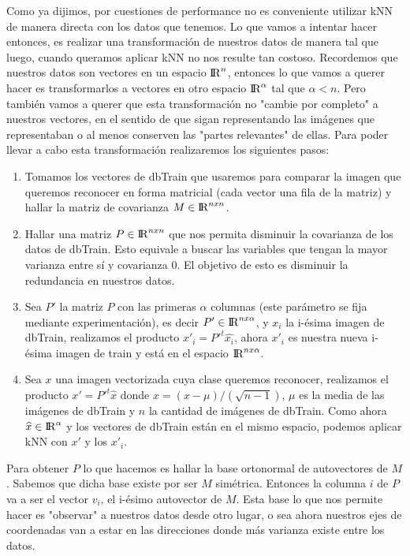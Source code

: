 \par Como ya dijimos, por cuestiones de performance no es conveniente utilizar kNN de manera directa con los datos que tenemos. Lo que vamos a intentar hacer entonces, es realizar una transformación de nuestros datos de manera tal que luego, cuando queramos aplicar kNN no nos resulte tan costoso. Recordemos que nuestros datos son vectores en un espacio ${\rm I\!R}^n$, entonces lo que vamos a querer hacer es transformarlos a vectores en otro espacio ${\rm I\!R}^\alpha$ tal que $\alpha < n$. Pero también vamos a querer que esta transformación no "cambie por completo" a nuestros vectores, en el sentido de que sigan representando las imágenes que representaban o al menos conserven las "partes relevantes" de ellas. Para poder llevar a cabo esta transformación realizaremos los siguientes pasos:

\begin{enumerate}
\item Tomamos los vectores de dbTrain que usaremos para comparar la imagen que queremos reconocer en forma matricial (cada vector una fila de la matriz) y hallar la matriz de covarianza $M \in {\rm I\!R}^{nxn}$.
\item Hallar una matriz $P \in {\rm I\!R}^{nxn}$ que nos permita disminuir la covarianza de los datos de dbTrain. Esto equivale a buscar las variables que tengan la mayor varianza entre sí y covarianza 0. El objetivo de esto es disminuir la redundancia en nuestros datos.
\item Sea $P'$ la matriz $P$ con las primeras $\alpha$ columnas (este parámetro se fija mediante experimentación), es decir $P' \in {\rm I\!R}^{nx\alpha}$, y $x_i$ la i-ésima imagen de dbTrain, realizamos el producto $x'_i = P'^t \widehat{x_i}$, ahora $x'_i$ es nuestra nueva i-ésima imagen de train y está en el espacio ${\rm I\!R}^{nx\alpha}$.
\item Sea $x$ una imagen vectorizada cuya clase queremos reconocer, realizamos el producto $x'= P'^t\widehat{x}$ donde $\widehat{x} = (x - \mu) / (\sqrt{n - 1})$, $\mu$ es la media de las imágenes de dbTrain y $n$ la cantidad de imágenes de dbTrain. Como ahora $\widehat{x} \in {\rm I\!R}^{\alpha}$ y los vectores de dbTrain están en el mismo espacio, podemos aplicar kNN con $x'$ y los $x'_i$.
\end{enumerate}

Para obtener $P$ lo que hacemos es hallar la base ortonormal de autovectores de $M$. Sabemos que dicha base existe por ser $M$ simétrica. Entonces la columna $i$ de $P$ va a ser el vector $v_i$, el i-ésimo autovector de $M$. Esta base lo que nos permite hacer es "observar" a nuestros datos desde otro lugar, o sea ahora nuestros ejes de coordenadas van a estar en las direcciones donde más varianza existe entre los datos.

